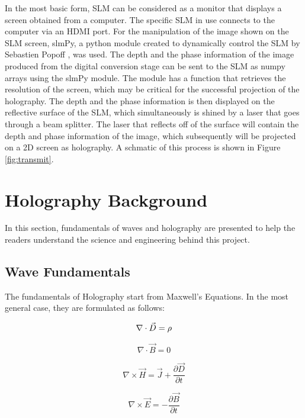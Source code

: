 \documentclass[12pt]{article}
\begin{document}
In the most basic form, SLM can be considered as a monitor that displays a screen obtained from a computer. The specific SLM in use connects to the computer via an HDMI port. For the manipulation of the image shown on the SLM screen, slmPy, a python module created to dynamically control the SLM by Sebastien Popoff \cite{slmPy}, was used. The depth and the phase information of the image produced from the digital conversion stage can be sent to the SLM as numpy arrays using the slmPy module. The module has a function that retrieves the resolution of the screen, which may be critical for the successful projection of the holography. The depth and the phase information is then displayed on the reflective surface of the SLM, which simultaneously is shined by a laser that goes through a beam splitter. The laser that reflects off of the surface will contain the depth and phase information of the image, which subsequently will be projected on a 2D screen as holography. A schmatic of this process is shown in Figure \ref{fig:transmit}.

\newpage
\section{Holography Background}

In this section, fundamentals of waves and holography are presented to help the readers understand the science and engineering behind this project.

\subsection{Wave Fundamentals}

The fundamentals of Holography start from Maxwell's Equations. In the most general case, they are formulated as follows:

\begin{equation}
	\nabla \cdot \vec{D} = \rho\\
\end{equation}

\begin{equation}
	\nabla \cdot \vec{B} = 0
\end{equation}

\begin{equation}
	\nabla \times \vec{H} = \vec{J} + \frac{\partial \vec{D}}{\partial t}
\end{equation}

\begin{equation}
	\nabla \times \vec{E} = -\frac{\partial \vec{B}}{\partial t}
\end{equation}
\end{document}
